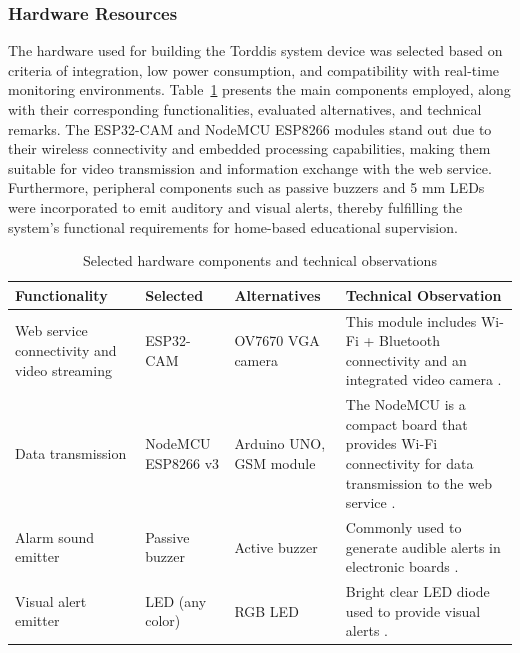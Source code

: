                 \subsubsection{Hardware Resources}
                The hardware used for building the Torddis system device was selected based on criteria of integration, low power consumption, and compatibility with real-time monitoring environments. Table~\ref{table:hardware-components} presents the main components employed, along with their corresponding functionalities, evaluated alternatives, and technical remarks. The ESP32-CAM and NodeMCU ESP8266 modules stand out due to their wireless connectivity and embedded processing capabilities, making them suitable for video transmission and information exchange with the web service. Furthermore, peripheral components such as passive buzzers and 5 mm LEDs were incorporated to emit auditory and visual alerts, thereby fulfilling the system’s functional requirements for home-based educational supervision.
                
                \begin{table}[!htbp]
                    \caption{Selected hardware components and technical observations}
                    \label{table:hardware-components}
                    \centering
                    {\footnotesize
%
                        \begin{tabular}{
                                >{\raggedright\arraybackslash}p{}
                                >{\raggedright\arraybackslash}p{}
                                >{\raggedright\arraybackslash}p{}
                                >{\raggedright\arraybackslash}p{}
                            }
                            \toprule
                            \textbf{Functionality} &
                            \textbf{Selected} &
                            \textbf{Alternatives} &
                            \textbf{Technical Observation} \\
                            \midrule
                            Web service connectivity and video streaming & ESP32-CAM & OV7670 VGA camera & This module includes Wi-Fi + Bluetooth connectivity and an integrated video camera \citep{CasasSanchez2022}. \\
                            Data transmission & NodeMCU ESP8266 v3 & Arduino UNO, GSM module & The NodeMCU is a compact board that provides Wi-Fi connectivity for data transmission to the web service \citep{Barai2019}. \\
                            Alarm sound emitter & Passive buzzer & Active buzzer & Commonly used to generate audible alerts in electronic boards \citep{Adebisi2023development}. \\
                            Visual alert emitter & 5mm LED (any color) & RGB LED & Bright clear LED diode used to provide visual alerts \citep{Upender2020}. \\
                            \bottomrule
                        \end{tabular}
                    }
                \end{table}
                
